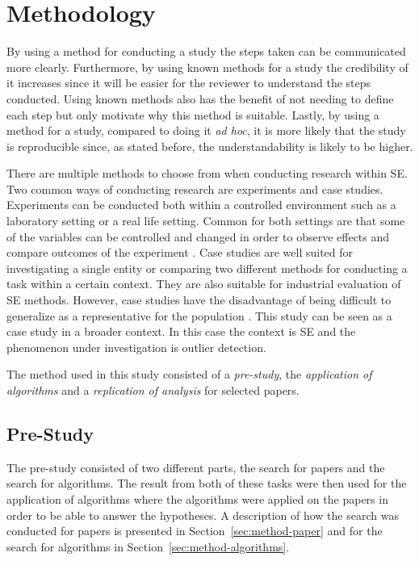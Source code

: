 ﻿\section{Methodology}
\label{sec:methodology}
By using a method for conducting a study the steps taken can be communicated more clearly. Furthermore, by using known methods for a study the credibility of it increases since it will be easier for the reviewer to understand the steps conducted. Using known methods also has the benefit of not needing to define each step but only motivate why this method is suitable. Lastly, by using a method for a study, compared to doing it \emph{ad hoc}, it is more likely that the study is reproducible since, as stated before, the understandability is likely to be higher.


There are multiple methods to choose from when conducting research within SE. Two common ways of conducting research are experiments and case studies. Experiments can be conducted both within a controlled environment such as a laboratory setting or a real life setting. Common for both settings are that some of the variables can be controlled and changed in order to observe effects and compare outcomes of the experiment \citep{wohlin2012experimentation}. Case studies are well suited for investigating a single entity or comparing two different methods for conducting a task within a certain context. They are also suitable for industrial evaluation of SE methods. However, case studies have the disadvantage of being difficult to generalize as a representative for the population \citep{runeson2009guidelines}. This study can be seen as a case study in a broader context. In this case the context is SE and the phenomenon under investigation is outlier detection.




The method used in this study consisted of a \emph{pre-study}, the \emph{application of algorithms} and a \emph{replication of analysis} for selected papers.




\subsection{Pre-Study}
The pre-study consisted of two different parts, the search for papers and the search for algorithms. The result from both of these tasks were then used for the application of algorithms where the algorithms were applied on the papers in order to be able to answer the hypotheses. A description of how the search was conducted for papers is presented in Section~\ref{sec:method-paper} and for the search for algorithms in Section~\ref{sec:method-algorithms}.




